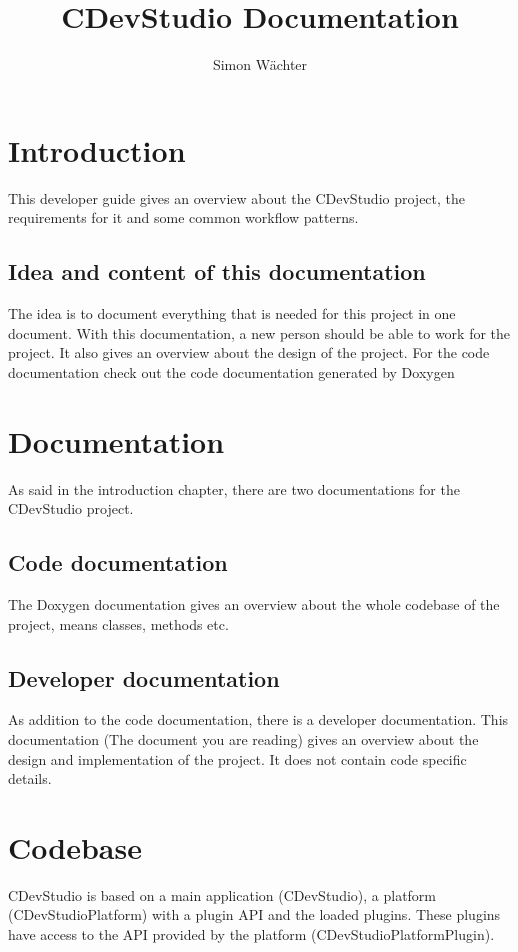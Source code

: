 \documentclass{article}
\title{CDevStudio Documentation}
\author{Simon Wächter}
\begin{document}
\maketitle
\newpage

\tableofcontents
\newpage

\section{Introduction}
This developer guide gives an overview about the CDevStudio project, the requirements for it and some common workflow patterns.

\subsection{Idea and content of this documentation}
The idea is to document everything that is needed for this project in one document. With this documentation, a new person should be able to work for the project. It also gives an overview about the design of the project. For the code documentation check out the code documentation generated by Doxygen

\section{Documentation}
As said in the introduction chapter, there are two documentations for the CDevStudio project.

\subsection{Code documentation}
The Doxygen documentation gives an overview about the whole codebase of the project, means classes, methods etc.

\subsection{Developer documentation}
As addition to the code documentation, there is a developer documentation. This documentation (The document you are reading) gives an overview about the design and implementation of the project. It does not contain code specific details.

\section{Codebase}
CDevStudio is based on a main application (CDevStudio), a platform (CDevStudioPlatform) with a plugin API and the loaded plugins. These plugins have access to the API provided by the platform (CDevStudioPlatformPlugin).
\end{document}
